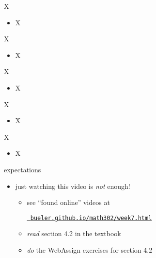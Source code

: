 \documentclass[dvipsnames]{beamer}
\begin{document}
\begin{frame}{X}

\begin{itemize}
\item X
\end{itemize}
\end{frame}

\begin{frame}{X}

\begin{itemize}
\item X
\end{itemize}
\end{frame}

\begin{frame}{X}

\begin{itemize}
\item X
\end{itemize}
\end{frame}

\begin{frame}{X}

\begin{itemize}
\item X
\end{itemize}
\end{frame}

\begin{frame}{X}

\begin{itemize}
\item X
\end{itemize}
\end{frame}


\begin{frame}{expectations}

\begin{itemize}
\item just watching this video is \emph{not} enough!
     \begin{itemize}
     \item see ``found online'' videos at

     \centerline{\href{https://bueler.github.io/math302/week7.html}{\tt \color{cyan} bueler.github.io/math302/week7.html}}
     \item \emph{read} section 4.2 in the textbook
     \item \emph{do} the WebAssign exercises for section 4.2
     \end{itemize}
\end{itemize}
\end{frame}
\end{document}
